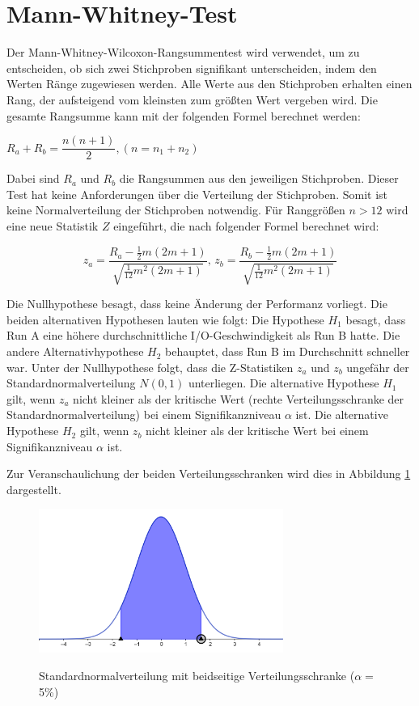 \section{Mann-Whitney-Test}
Der Mann-Whitney-Wilcoxon-Rangsummentest \cite[130 ff.]{statistik_sozialwissenschaften} \cite{u_test} wird verwendet, um zu entscheiden, 
ob sich zwei Stichproben signifikant unterscheiden, indem den Werten Ränge zugewiesen werden. Alle Werte aus den Stichproben erhalten einen Rang,
 der aufsteigend vom kleinsten zum größten Wert vergeben wird. Die gesamte Rangsumme kann mit der folgenden Formel berechnet werden:
\begin{center}
  $R_a + R_b = \dfrac{n(n + 1)}{2}, (n = n_1 + n_2)$
\end{center}  

Dabei sind $R_a$ und $R_b$ die Rangsummen aus den jeweiligen Stichproben.
Dieser Test
hat keine Anforderungen über die Verteilung der Stichproben.
Somit ist keine Normalverteilung der Stichproben notwendig.
Für Ranggrößen $n>12$ wird eine neue Statistik $Z$ eingeführt, die nach folgender Formel berechnet wird:
\begin{center}
  \[
    z_{a} = \frac{R_{a} - \frac{1}{2}m(2m+1)}{\sqrt{\frac{1}{12}m^2(2m+1)}} \text{, }
    z_{b} = \frac{R_{b} - \frac{1}{2}m(2m+1)}{\sqrt{\frac{1}{12}m^2(2m+1)}}
  \]
\end{center}

Die Nullhypothese besagt, dass keine Änderung der Performanz vorliegt. 
Die beiden alternativen Hypothesen lauten wie folgt: Die Hypothese $H_1$ besagt, dass Run A eine höhere durchschnittliche I/O-Geschwindigkeit als Run B hatte. 
Die andere Alternativhypothese $H_2$ behauptet, dass Run B im Durchschnitt schneller war.
Unter der Nullhypothese folgt, dass die Z-Statistiken $z_a$ und $z_b$ ungefähr der Standardnormalverteilung $N(0,1)$ unterliegen. 
Die alternative Hypothese $H_1$ gilt, wenn $z_a$ nicht kleiner als der kritische Wert (rechte Verteilungsschranke der Standardnormalverteilung)
 bei einem Signifikanzniveau $\alpha$ ist. Die alternative Hypothese $H_2$ gilt, wenn $z_b$ nicht kleiner als der kritische Wert bei einem Signifikanzniveau $\alpha$ ist.

\newpage
 Zur Veranschaulichung der beiden Verteilungsschranken wird dies in Abbildung \ref{fig:Standardnormalverteilung} dargestellt.
\begin{figure}[h]
  \caption{Standardnormalverteilung mit beidseitige Verteilungsschranke ($\alpha=$ 5\%)}
  \label{fig:Standardnormalverteilung}
  \includegraphics[width=8cm]{Bilder/geogebra-export.png}
  \centering
  \cite{graph_normalverteilung}
\end{figure}

